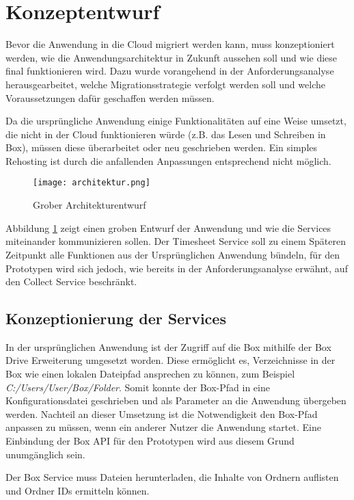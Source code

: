 \section{Konzeptentwurf}
Bevor die Anwendung in die Cloud migriert werden kann, muss konzeptioniert werden, wie die Anwendungsarchitektur in Zukunft aussehen soll und wie diese final funktionieren wird. Dazu wurde vorangehend in der Anforderungsanalyse herausgearbeitet, welche Migrationsstrategie verfolgt werden soll und welche Voraussetzungen dafür geschaffen werden müssen.

Da die ursprüngliche Anwendung einige Funktionalitäten auf eine Weise umsetzt, die nicht in der Cloud funktionieren würde (z.B. das Lesen und Schreiben in Box), müssen diese überarbeitet oder neu geschrieben werden. Ein simples Rehosting ist durch die anfallenden Anpassungen entsprechend nicht möglich.

\begin{figure}[H]
    \centering
    \texttt{[image: architektur.png]}
    \caption{Grober Architekturentwurf}
    \label{fig:Architektur}
\end{figure}

Abbildung \ref{fig:Architektur} zeigt einen groben  Entwurf der Anwendung und wie die Services miteinander kommunizieren sollen. Der Timesheet Service soll zu einem Späteren Zeitpunkt alle Funktionen aus der Ursprünglichen Anwendung bündeln, für den Prototypen wird sich jedoch, wie bereits in der Anforderungsanalyse erwähnt, auf den Collect Service beschränkt.

\subsection{Konzeptionierung der Services}
In der ursprünglichen Anwendung ist der Zugriff auf die Box mithilfe der Box Drive Erweiterung umgesetzt worden. Diese ermöglicht es, Verzeichnisse in der Box wie einen lokalen Dateipfad ansprechen zu können, zum Beispiel \textit{C:/Users/User/Box/Folder}. Somit konnte der Box-Pfad in eine Konfigurationsdatei geschrieben und als Parameter an die Anwendung übergeben werden. Nachteil an dieser Umsetzung ist die Notwendigkeit den Box-Pfad anpassen zu müssen, wenn ein anderer Nutzer die Anwendung startet. Eine Einbindung der Box \ac{API} für den Prototypen wird aus diesem Grund unumgänglich sein.

Der Box Service muss Dateien herunterladen, die Inhalte von Ordnern auflisten und Ordner IDs ermitteln können.

